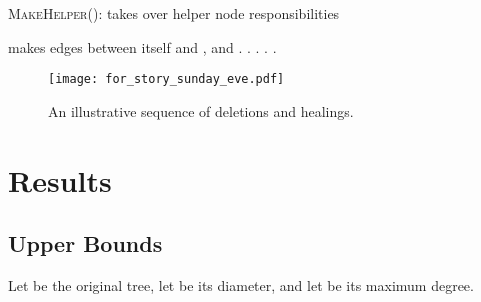 \documentclass[11pt]{article}
\begin{document}
\begin{algorithm}[h!]
\caption{\textsc{MakeHelper()}:  takes over helper node responsibilities}
\label{algo: makehelper}
\begin{algorithmic}[1]
\STATE  makes edges between itself and , and .
\STATE .
\STATE .
\STATE .
\IF{}
 \STATE .  
 \ENDIF
\end{algorithmic}
\end{algorithm}
















\begin{figure}[t]
\centering
\texttt{[image: for\_story\_sunday\_eve.pdf]}
\caption{An illustrative sequence of deletions and healings.}
\label{fig: story}
\end{figure}





\section{Results}
\label{subsec: Results}

\subsection{Upper Bounds}
\label{subsec: upperbounds}

Let  be  the original tree, let  be its diameter, and let  be its maximum degree.
\end{document}
